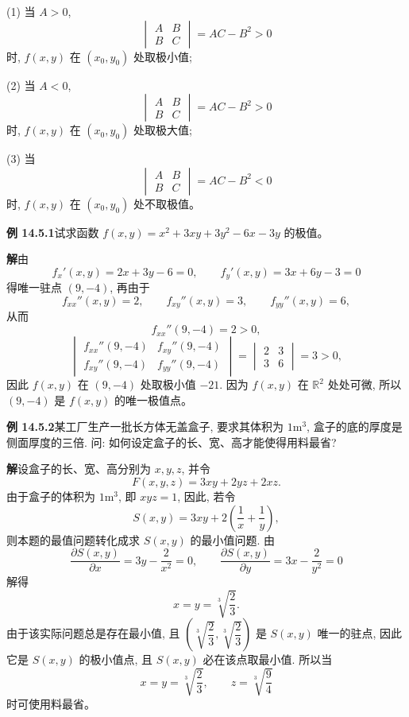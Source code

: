 \documentclass[UTF8,12pt,a4paper,fontset=fandol]{ctexart}
\begin{document}
\noindent (1) 当 $A>0$,
\[
  \begin{vmatrix}
    A & B\\
    B & C
  \end{vmatrix}
  =AC-B^2>0
\]
时, $f(x,y)$ 在 $(x_0,y_0)$ 处取极小值;

\noindent (2) 当 $A<0$,
\[
  \begin{vmatrix}
    A & B\\
    B & C
  \end{vmatrix}
  =AC-B^2>0
\]
时, $f(x,y)$ 在 $(x_0,y_0)$ 处取极大值;

\noindent (3) 当
\[
  \begin{vmatrix}
    A & B\\
    B & C
  \end{vmatrix}
  =AC-B^2<0
\]
时, $f(x,y)$ 在 $(x_0,y_0)$ 处不取极值。

\noindent\textbf{例 14.5.1}\quad 试求函数 $f(x,y)=x^2+3xy+3y^2-6x-3y$ 的极值。

\noindent\textbf{解}\quad 由
\[
  f_x'(x,y)=2x+3y-6=0,\qquad
  f_y'(x,y)=3x+6y-3=0
\]
得唯一驻点 $(9,-4)$, 再由于
\[
  f_{xx}''(x,y)=2,\qquad f_{xy}''(x,y)=3,\qquad f_{yy}''(x,y)=6,
\]
从而
\[
  f_{xx}''(9,-4)=2>0,
\]
\[
  \begin{vmatrix}
    f_{xx}''(9,-4) & f_{xy}''(9,-4)\\
    f_{xy}''(9,-4) & f_{yy}''(9,-4)
  \end{vmatrix}
  =
  \begin{vmatrix}
    2 & 3\\
    3 & 6
  \end{vmatrix}
  =3>0,
\]
因此 $f(x,y)$ 在 $(9,-4)$ 处取极小值 $-21$. 因为 $f(x,y)$ 在 $\mathbb R^2$ 处处可微, 所以 $(9,-4)$ 是 $f(x,y)$ 的唯一极值点。

\noindent\textbf{例 14.5.2}\quad 某工厂生产一批长方体无盖盒子, 要求其体积为 $1\mathrm{m}^3$, 盒子的底的厚度是侧面厚度的三倍. 问: 如何设定盒子的长、宽、高才能使得用料最省?

\noindent\textbf{解}\quad 设盒子的长、宽、高分别为 $x,y,z$, 并令
\[
  F(x,y,z)=3xy+2yz+2xz.
\]
由于盒子的体积为 $1\mathrm{m}^3$, 即 $xyz=1$, 因此, 若令
\[
  S(x,y)=3xy+2\left(\frac1x+\frac1y\right),
\]
则本题的最值问题转化成求 $S(x,y)$ 的最小值问题. 由
\[
  \frac{\partial S(x,y)}{\partial x}=3y-\frac2{x^2}=0,\qquad
  \frac{\partial S(x,y)}{\partial y}=3x-\frac2{y^2}=0
\]
解得
\[
  x=y=\sqrt[3]{\frac23}.
\]
由于该实际问题总是存在最小值, 且 $\left(\sqrt[3]{\dfrac23},\sqrt[3]{\dfrac23}\right)$ 是 $S(x,y)$ 唯一的驻点, 因此它是 $S(x,y)$ 的极小值点, 且 $S(x,y)$ 必在该点取最小值. 所以当
\[
  x=y=\sqrt[3]{\frac23},\qquad z=\sqrt[3]{\frac94}
\]
时可使用料最省。
\end{document}
